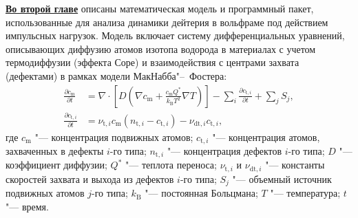 \underline{\textbf{Во второй главе}} описаны математическая модель и программный пакет, использованные для анализа динамики дейтерия в вольфраме под действием импульсных нагрузок. Модель включает систему дифференциальных уравнений, описывающих диффузию атомов изотопа водорода в материалах с учетом термодиффузии (эффекта Соре) и взаимодействия с центрами захвата (дефектами) в рамках модели МакНабба"--~Фостера:
\begin{subequations}
    \label{eq:hydrogen_transport}
    \begin{align}
        \frac{\partial c_\mathrm{m}}{\partial t}     & = \nabla \cdot \left[ D \left( \nabla c_\mathrm{m} + \frac{c_\mathrm{m} Q^*}{k_\mathrm{B}T^2} \nabla T \right) \right] - \sum \limits_i \frac{\partial c_{\mathrm{t},i}}{\partial t} + \sum \limits_j S_j, \\
        \frac{\partial c_{\mathrm{t},i}}{\partial t} & = \nu_{\mathrm{t},i} c_\mathrm{m} (n_{\mathrm{t},i} - c_{\mathrm{t},i}) - \nu_{\mathrm{dt},i} c_{\mathrm{t},i},
    \end{align}
\end{subequations}
где \( c_\mathrm{m} \) "--- концентрация подвижных  атомов; \( c_{\mathrm{t},i} \) "--- концентрация атомов, захваченных в дефекты $i$-го типа; \( n_{\mathrm{t},i} \) "--- концентрация дефектов $i$-го типа; \( D \) "--- коэффициент диффузии; \( Q^* \) "--- теплота переноса; \( \nu_{\mathrm{t},i} \) и \( \nu_{\mathrm{dt},i} \) "--- константы скоростей захвата и выхода из дефектов $i$-го типа; \( S_j \) "--- объемный источник подвижных атомов $j$-го типа; \( k_\mathrm{B} \) "--- постоянная Больцмана; \( T \) "--- температура; \( t \) "--- время.

